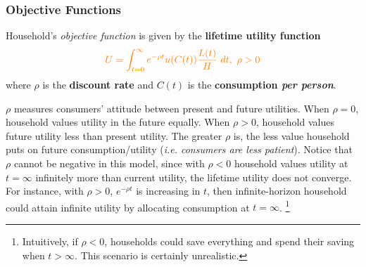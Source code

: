 \documentclass[11pt]{article}
\begin{document}
	\subsubsection{Objective Functions}
	\par Household's \emph{objective function} is given by the \textbf{lifetime utility function}
	\begin{equation}
		\textcolor{orange}{
			U = \int_{t=0}^\infty {e^{-\rho t} u(C(t)) \frac{L(t)}{H}}\ dt,\ \rho > 0
		}
	\end{equation}
	where $\rho$ is the \textbf{discount rate} and $C(t)$ is the \textbf{consumption \emph{per person}}.
	\begin{remark}
		$\rho$ measures consumers' attitude between present and future utilities.
		When $\rho = 0$, household values utility in the future equally. 
		When $\rho > 0$, household values future utility less than present utility.
		The greater $\rho$ is, the less value household puts on future consumption/utility (\emph{i.e. consumers are less patient}).
		Notice that $\rho$ cannot be negative in this model, since with $\rho < 0$ household values utility at $t=\infty$ infinitely more than current utility, the lifetime utility does not converge. For instance, with $\rho>0$, $e^{-\rho t}$ is increasing in $t$, then infinite-horizon household could attain infinite utility by allocating consumption at $t=\infty$.
		\footnote{Intuitively, if $\rho < 0$, households could save everything and spend their saving when $t > \infty$. This scenario is certainly unrealistic.}
	\end{remark}
	
\end{document}
